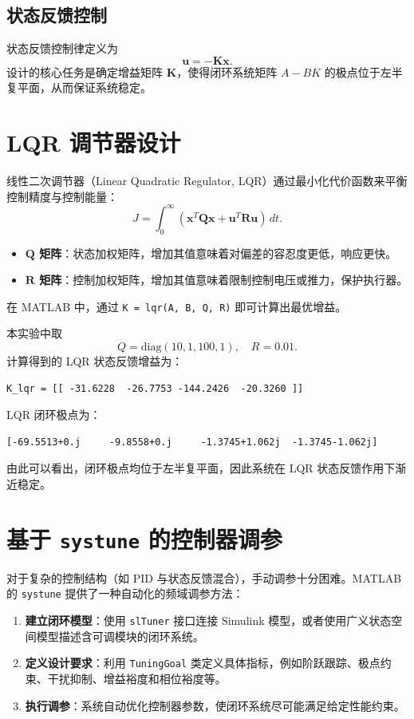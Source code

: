 \documentclass[11pt]{article}
\begin{document}
\subsection{状态反馈控制}
状态反馈控制律定义为
\begin{equation}
\bm{u} = -\bm{K}\bm{x}.
\end{equation}
设计的核心任务是确定增益矩阵 $\bm{K}$，使得闭环系统矩阵 $A-BK$ 的极点位于左半复平面，从而保证系统稳定。

\section{LQR 调节器设计}
线性二次调节器（Linear Quadratic Regulator, LQR）通过最小化代价函数来平衡控制精度与控制能量：
\begin{equation}
    J = \int_{0}^{\infty} (\bm{x}^T\bm{Q}\bm{x} + \bm{u}^T\bm{R}\bm{u})\, dt.
\end{equation}
\begin{itemize}
    \item \textbf{$\bm{Q}$ 矩阵}：状态加权矩阵，增加其值意味着对偏差的容忍度更低，响应更快。
    \item \textbf{$\bm{R}$ 矩阵}：控制加权矩阵，增加其值意味着限制控制电压或推力，保护执行器。
\end{itemize}
在 MATLAB 中，通过 \texttt{K = lqr(A, B, Q, R)} 即可计算出最优增益。

本实验中取
\begin{equation}
Q=\mathrm{diag}(10,1,100,1),\quad R=0.01.
\end{equation}
计算得到的 LQR 状态反馈增益为：
\begin{verbatim}
K_lqr = [[ -31.6228  -26.7753 -144.2426  -20.3260 ]]
\end{verbatim}
LQR 闭环极点为：
\begin{verbatim}
[-69.5513+0.j     -9.8558+0.j     -1.3745+1.062j  -1.3745-1.062j]
\end{verbatim}
由此可以看出，闭环极点均位于左半复平面，因此系统在 LQR 状态反馈作用下渐近稳定。

\section{基于 \texttt{systune} 的控制器调参}
对于复杂的控制结构（如 PID 与状态反馈混合），手动调参十分困难。MATLAB 的 \texttt{systune} 提供了一种自动化的频域调参方法：
\begin{enumerate}
    \item \textbf{建立闭环模型}：使用 \texttt{slTuner} 接口连接 Simulink 模型，或者使用广义状态空间模型描述含可调模块的闭环系统。
    \item \textbf{定义设计要求}：利用 \texttt{TuningGoal} 类定义具体指标，例如阶跃跟踪、极点约束、干扰抑制、增益裕度和相位裕度等。
    \item \textbf{执行调参}：系统自动优化控制器参数，使闭环系统尽可能满足给定性能约束。
\end{enumerate}
\end{document}
